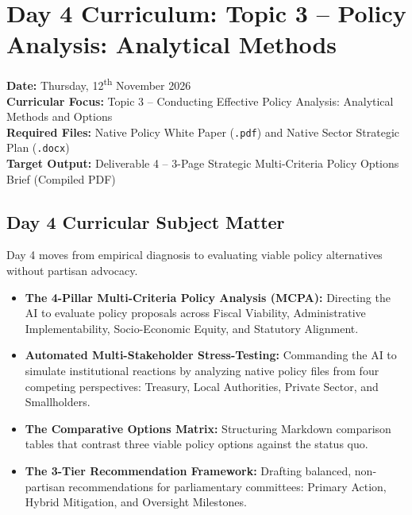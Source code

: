 \documentclass[11pt, a4paper]{report}
\begin{document}
\newpage

\chapter{Day 4 Curriculum: Topic 3 -- Policy Analysis: Analytical Methods}
\textbf{Date:} Thursday, 12\textsuperscript{th} November 2026\\
\textbf{Curricular Focus:} Topic 3 -- Conducting Effective Policy Analysis: Analytical Methods and Options\\
\textbf{Required Files:} Native Policy White Paper (\texttt{.pdf}) and Native Sector Strategic Plan (\texttt{.docx})\\
\textbf{Target Output:} Deliverable 4 -- 3-Page Strategic Multi-Criteria Policy Options Brief (Compiled PDF)

\section{Day 4 Curricular Subject Matter}
Day 4 moves from empirical diagnosis to evaluating viable policy alternatives without partisan advocacy.
\begin{itemize}[label=-]
    \item \textbf{The 4-Pillar Multi-Criteria Policy Analysis (MCPA):} Directing the AI to evaluate policy proposals across Fiscal Viability, Administrative Implementability, Socio-Economic Equity, and Statutory Alignment.
    \item \textbf{Automated Multi-Stakeholder Stress-Testing:} Commanding the AI to simulate institutional reactions by analyzing native policy files from four competing perspectives: Treasury, Local Authorities, Private Sector, and Smallholders.
    \item \textbf{The Comparative Options Matrix:} Structuring Markdown comparison tables that contrast three viable policy options against the status quo.
    \item \textbf{The 3-Tier Recommendation Framework:} Drafting balanced, non-partisan recommendations for parliamentary committees: Primary Action, Hybrid Mitigation, and Oversight Milestones.
\end{itemize}
\end{document}
